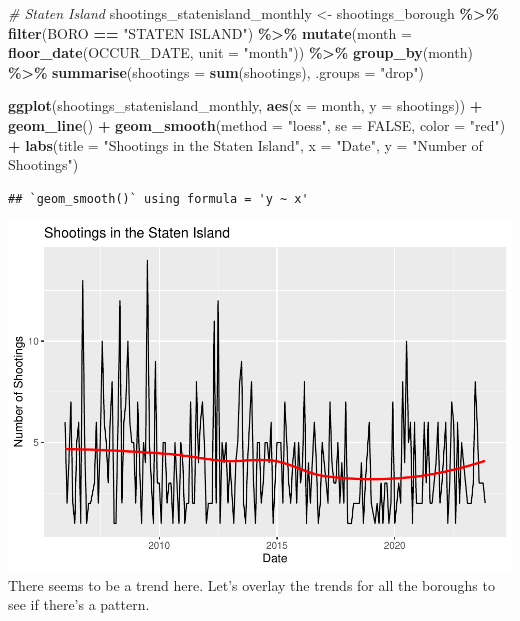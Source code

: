 \documentclass[
]{article}
\newenvironment{Shaded}{\begin{snugshade}}{\end{snugshade}}
\newcommand{\AttributeTok}[1]{\textcolor[rgb]{0.13,0.29,0.53}{#1}}
\newcommand{\CommentTok}[1]{\textcolor[rgb]{0.56,0.35,0.01}{\textit{#1}}}
\newcommand{\ConstantTok}[1]{\textcolor[rgb]{0.56,0.35,0.01}{#1}}
\newcommand{\FunctionTok}[1]{\textcolor[rgb]{0.13,0.29,0.53}{\textbf{#1}}}
\newcommand{\NormalTok}[1]{#1}
\newcommand{\OtherTok}[1]{\textcolor[rgb]{0.56,0.35,0.01}{#1}}
\newcommand{\SpecialCharTok}[1]{\textcolor[rgb]{0.81,0.36,0.00}{\textbf{#1}}}
\newcommand{\StringTok}[1]{\textcolor[rgb]{0.31,0.60,0.02}{#1}}
\begin{document}
\begin{Shaded}
\begin{Highlighting}[]
\CommentTok{\# Staten Island}
\NormalTok{shootings\_statenisland\_monthly }\OtherTok{\textless{}{-}}\NormalTok{ shootings\_borough }\SpecialCharTok{\%\textgreater{}\%}
  \FunctionTok{filter}\NormalTok{(BORO }\SpecialCharTok{==} \StringTok{"STATEN ISLAND"}\NormalTok{) }\SpecialCharTok{\%\textgreater{}\%}
  \FunctionTok{mutate}\NormalTok{(}\AttributeTok{month =} \FunctionTok{floor\_date}\NormalTok{(OCCUR\_DATE, }\AttributeTok{unit =} \StringTok{"month"}\NormalTok{)) }\SpecialCharTok{\%\textgreater{}\%}
  \FunctionTok{group\_by}\NormalTok{(month) }\SpecialCharTok{\%\textgreater{}\%}
  \FunctionTok{summarise}\NormalTok{(}\AttributeTok{shootings =} \FunctionTok{sum}\NormalTok{(shootings), }\AttributeTok{.groups =} \StringTok{"drop"}\NormalTok{)}

\FunctionTok{ggplot}\NormalTok{(shootings\_statenisland\_monthly, }\FunctionTok{aes}\NormalTok{(}\AttributeTok{x =}\NormalTok{ month, }\AttributeTok{y =}\NormalTok{ shootings)) }\SpecialCharTok{+}
  \FunctionTok{geom\_line}\NormalTok{() }\SpecialCharTok{+}
  \FunctionTok{geom\_smooth}\NormalTok{(}\AttributeTok{method =} \StringTok{"loess"}\NormalTok{, }\AttributeTok{se =} \ConstantTok{FALSE}\NormalTok{, }\AttributeTok{color =} \StringTok{"red"}\NormalTok{) }\SpecialCharTok{+}
  \FunctionTok{labs}\NormalTok{(}\AttributeTok{title =} \StringTok{"Shootings in the Staten Island"}\NormalTok{,}
       \AttributeTok{x =} \StringTok{"Date"}\NormalTok{,}
       \AttributeTok{y =} \StringTok{"Number of Shootings"}\NormalTok{)}
\end{Highlighting}
\end{Shaded}

\begin{verbatim}
## `geom_smooth()` using formula = 'y ~ x'
\end{verbatim}

\includegraphics{nypd-shooting-data-analysis_files/figure-latex/trend-shootings-statenisland-1.pdf}
There seems to be a trend here. Let's overlay the trends for all the
boroughs to see if there's a pattern.
\end{document}
